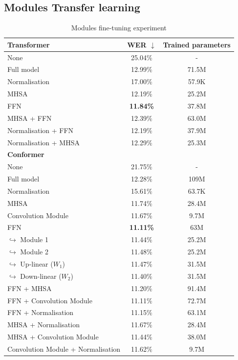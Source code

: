 \subsection{Modules Transfer learning}
\begin{table}
    \begin{center}
        \begin{tabular}{lcc}\hline
            \textbf{Transformer}    & WER  $\downarrow$   & Trained parameters \\ \hline
            None & 25.04\% & -   \\
            Full model   & 12.99\% & 71.5M   \\ \hline
            Normalisation & 17.00\% & 57.9K  \\
            MHSA & 12.19\% & 25.2M  \\
            FFN    & \textbf{11.84\%}     &  37.8M \\ \hline
            MHSA + FFN & 12.39\% & 63.0M \\
            Normalisation + FFN & 12.19\% & 37.9M \\
            Normalisation + MHSA & 12.29\% & 25.3M\\ \hline \hline
            \textbf{Conformer}    &     & \\ \hline
            None & 21.75\% & -   \\
            Full model   & 12.28\% & 109M   \\ \hline
            Normalisation & 15.61\% & 63.7K  \\
            MHSA & 11.74\% & 28.4M  \\
            Convolution Module & 11.67\% & 9.7M \\
            FFN    & \textbf{11.11\%}     &  63M \\
            \quad $\hookrightarrow$ Module 1    & 11.44\%     &  25.2M \\
            \quad $\hookrightarrow$ Module 2    & 11.48\%     &  25.2M \\
            \quad $\hookrightarrow$ Up-linear ($W_1$)    & 11.47\%     &  31.5M \\
            \quad $\hookrightarrow$ Down-linear ($W_2$)    & 11.40\%     &  31.5M \\ \hline
            FFN + MHSA & 11.20\% & 91.4M \\
            FFN + Convolution Module & 11.11\% & 72.7M \\
            FFN + Normalisation & 11.15\% & 63.1M \\
            MHSA + Normalisation & 11.67\% & 28.4M \\
            MHSA + Convolution Module & 11.44\% & 38.0M \\
            Convolution Module + Normalisation & 11.62\% & 9.7M\\ \hline
        \end{tabular}
    \end{center}
    \caption{Modules fine-tuning experiment}
    \label{table:ModulesTL}
\end{table}
